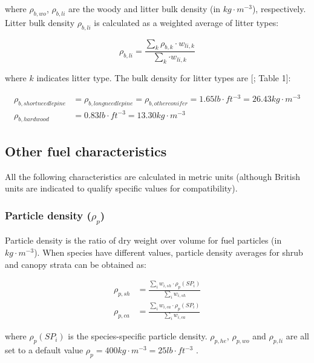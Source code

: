\documentclass[]{book}
\begin{document}
where \(\rho_{b, wo}\), \(\rho_{b, li}\) are the woody and litter bulk
density (in \(kg\cdot m^{-3}\)), respectively. Litter bulk density
\(\rho_{b,li}\) is calculated as a weighted average of litter types:

\begin{equation}
 \rho_{b,li} = \frac{\sum_{k}{ \rho_{b,k}\cdot w_{li,k}}}{\sum_{k} {\cdot w_{li,k}}}
\end{equation}

where \(k\) indicates litter type. The bulk density for litter types are
{[}\citet{Prichard2013}; Table 1{]}:

\begin{eqnarray}
\rho_{b,shortneedlepine} &= \rho_{b,longneedlepine} = \rho_{b,otherconifer}= 1.65 lb\cdot ft^{-3} = 26.43 kg\cdot m^{-3}\\
\rho_{b,hardwood} &= 0.83 lb\cdot ft^{-3} = 13.30  kg\cdot m^{-3}
\end{eqnarray}

\subsection{Other fuel
characteristics}\label{other-fuel-characteristics}

All the following characteristics are calculated in metric units
(although British units are indicated to qualify specific values for
compatibility).

\subsubsection{\texorpdfstring{Particle density
(\(\rho_{p}\))}{Particle density (\textbackslash{}rho\_\{p\})}}\label{particle-density-rho_p}

Particle density is the ratio of dry weight over volume for fuel
particles (in \(kg\cdot m^{-3}\)). When species have different values,
particle density averages for shrub and canopy strata can be obtained
as:

\begin{eqnarray}
\rho_{p, sh} &= \frac{\sum_{i}{w_{i,sh} \cdot \rho_p(SP_i)}}{\sum_{i}{w_{i,sh}}}\\
\rho_{p, ca} &= \frac{\sum_{i}{w_{i,ca} \cdot \rho_p(SP_i)}}{\sum_{i}{w_{i,ca}}}
\end{eqnarray}

where \(\rho_p(SP_i)\) is the species-specific particle density.
\(\rho_{p, he}\), \(\rho_{p, wo}\) and \(\rho_{p, li}\) are all set to a
default value \(\rho_{p} = 400 kg\cdot m^{-3}= 25 lb\cdot ft^{-3}\)
\citep{Prichard2013}.
\end{document}

